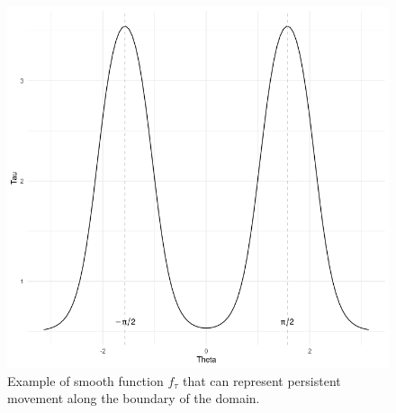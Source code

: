 \documentclass[11pt]{article}
\newcommand {\1}{\mathbb{1}}
\theoremstyle{definition}
\theoremstyle{remark}
\theoremstyle{remark}
\begin{document}
 \begin{figure}[h]
 	\centering
 	\includegraphics[scale=0.3]{images/crcvm/smooth_tau_bump}
 	\caption{Example of smooth function $f_{\tau}$ that can represent persistent movement along the boundary of the domain.}
 	\label{fig:smoothtaubump}
 \end{figure}
 
\end{document}
